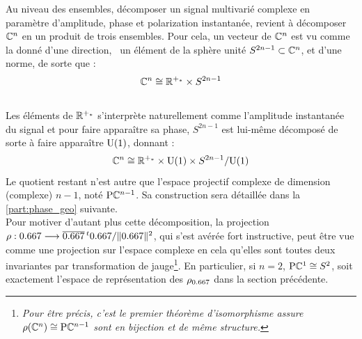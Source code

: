 
Au niveau des ensembles, décomposer un signal multivarié complexe en paramètre d'amplitude, phase et polarization instantanée, revient à décomposer $\mathbb{C}^n$ en un produit de trois ensembles. Pour cela, un vecteur de $\mathbb{C}^n$ est vu comme la donné d'une direction, \ie~un élément de la sphère unité $S^{2n-1}\subset\mathbb{C}^n$, et d'une norme, de sorte que :
\[\mathbb{C}^n \cong \mathbb{R}^{+_*} \times S^{2n-1}\]
\\
Les éléments de $\mathbb{R}^{+_*}$ s'interprète naturellement comme l'amplitude instantanée du signal et pour faire apparaître sa phase, $S^{2n-1}$ est lui-même décomposé de sorte à faire apparaître $\text{\normalfont U}(1)$, donnant :
\[\mathbb{C}^n \cong \mathbb{R}^{+_*} \times \text{\normalfont U}(1) \times S^{2n-1}/\text{\normalfont U}(1)\]
Le quotient restant n'est autre que l'espace projectif complexe de dimension (complexe) $n-1$, noté $\text{\normalfont P}\mathbb{C}^{n-1}$. Sa construction sera détaillée dans la \cref{part:phase_geo} suivante.
\\

Pour motiver d'autant plus cette décomposition, la projection $\rho : \x \lr \congu{\x}\,^t\x / \|\x\|^2$, qui s'est avérée fort instructive, peut être vue comme une projection sur l'espace complexe en cela qu'elles sont toutes deux invariantes par transformation de jauge\footnote{\itshape
	Pour être précis, c'est le premier théorème d'isomorphisme assure $\rho(\mathbb{C}^n) \cong\text{\normalfont P}\mathbb{C}^{n-1}$ sont en bijection et de même structure.}.
En particulier, si $n=2$, $\text{\normalfont P}\mathbb{C}^{1}\cong S^{2}$, soit exactement l'espace de représentation des $\rho_{\x}$ dans la section précédente.
